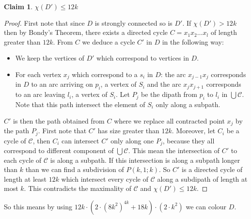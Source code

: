 \documentclass[utf8,10pt]{article}
\theoremstyle{plain}
\newtheorem{claim}{Claim}[theorem]
\theoremstyle{definition}
\theoremstyle{remark}
\newcommand{\dr}{ k^2}
\newcommand{\col}{(8k^2)^{4k}}
\begin{document}
\begin{claim}\label{cl:nocycle}
$\chi(D') \leq 12k$
\end{claim} 

\begin{proof}
First note that since $D$ is strongly connected so is $D'$. If $\chi(D') > 12k$ then by Bondy's Theorem, there exists
a directed cycle $C = x_1x_2 \dots x_l$ of length greater than $12k$. From $C$ we deduce a cycle $C'$ in $D$ in the following way: 
\begin{itemize}
	\item We keep the vertices of $D'$ which correspond to vertices in $D$.
	\item For each vertex $x_j$ which correspond to a $s_i$ in $D$: the arc $x_{j-1}x_j$ corresponds in $D$ to an arc arriving on 
		$p_i$, a vertex of $S_i$ and the arc $x_jx_{j+1}$ corresponds to an arc leaving $l_i$, a vertex of $S_i$. Let $P_j$ be the dipath 
		from $p_i$ to $l_i$ in $\bigcup \mathcal{C}$. Note that this path intersect the element of $S_i$ only along a subpath. 
\end{itemize}
$C'$ is then the path obtained from $C$ where we replace all contracted point $x_j$ by the path $P_j$. 
First note that $C'$ has size greater than $12k$. Moreover, let $C_i$ be a cycle of $\mathcal{C}$, then $C_i$ can
intersect $C'$ only along one $P_j$, because they all correspond to different component of $\bigcup \mathcal{C}$. This mean the
intersection of $C'$ to each cycle of $\mathcal{C}$ is along a subpath. If this intersection is along a subpath longer than $k$ than we can 
find a subdivision of $P(k,1;k)$. So $C'$ is a directed cycle of length at least $12k$ which intersect every cycle of $\mathcal{C}$ along a 
subdipath of length at most $k$. This contradicts the maximality of $\mathcal{C}$ and $\chi(D') \leq 12k$.
\end{proof}


So this means by using $12k \cdot (2\cdot \col + 18k) \cdot (2 \cdot \dr)$ we can colour $D$.
\end{document}
